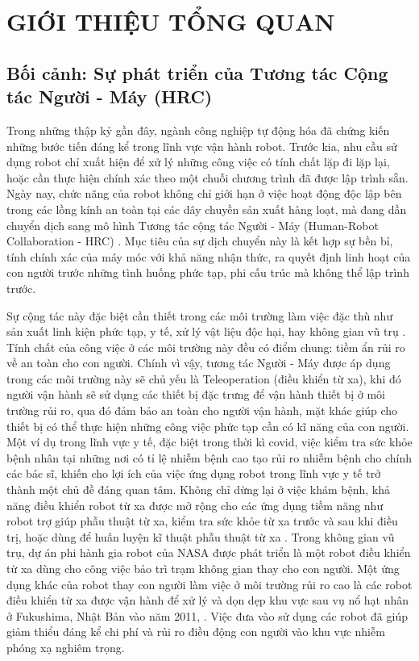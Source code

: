 
\chapter{GIỚI THIỆU TỔNG QUAN}

\section{Bối cảnh: Sự phát triển của Tương tác Cộng tác Người - Máy (HRC)}
Trong những thập kỷ gần đây, ngành công nghiệp tự động hóa đã chứng kiến những bước tiến đáng kể trong lĩnh vực vận hành robot. Trước kia, nhu cầu sử dụng robot chỉ xuất hiện để xử lý những công việc có tính chất lặp đi lặp lại, hoặc cần thực hiện chính xác theo một chuỗi chương trình đã được lập trình sẵn. Ngày nay, chức năng của robot không chỉ giới hạn ở việc hoạt động độc lập bên trong các lồng kính an toàn tại các dây chuyền sản xuất hàng loạt, mà đang dần chuyển dịch sang mô hình Tương tác cộng tác Người - Máy (Human-Robot Collaboration - HRC) \cite{wang2024genealogy}. Mục tiêu của sự dịch chuyển này là kết hợp sự bền bỉ, tính chính xác của máy móc với khả năng nhận thức, ra quyết định linh hoạt của con người trước những tình huống phức tạp, phi cấu trúc mà không thể lập trình trước.

Sự cộng tác này đặc biệt cần thiết trong các môi trường làm việc đặc thù như sản xuất linh kiện phức tạp, y tế, xử lý vật liệu độc hại, hay không gian vũ trụ \cite{pryor2023virtualspace}. Tính chất của công việc ở các môi trường này đều có điểm chung: tiềm ẩn rủi ro về an toàn cho con người. Chính vì vậy, tương tác Người - Máy được áp dụng trong các môi trường này sẽ chủ yếu là Teleoperation (điều khiển từ xa), khi đó người vận hành sẽ sử dụng các thiết bị đặc trưng để vận hành thiết bị ở môi trường rủi ro, qua đó đảm bảo an toàn cho người vận hành, mặt khác giúp cho thiết bị có thể thực hiện những công việc phức tạp cần có kĩ năng của con người. Một ví dụ trong lĩnh vực y tế, đặc biệt trong thời kì covid, việc kiểm tra sức khỏe bệnh nhân tại những nơi có tỉ lệ nhiễm bệnh cao tạo rủi ro nhiễm bệnh cho chính các bác sĩ, khiến cho lợi ích của việc ứng dụng robot trong lĩnh vực y tế trở thành một chủ đề đáng quan tâm. Không chỉ dừng lại ở việc khám bệnh, khả năng điều khiển robot từ xa được mở rộng cho các ứng dụng tiềm năng như robot trợ giúp phẫu thuật từ xa, kiểm tra sức khỏe từ xa trước và sau khi điều trị, hoặc dùng để huấn luyện kĩ thuật phẫu thuật từ xa \cite{Su2022MixedRealityEnhancedHI}. Trong không gian vũ trụ, dự án phi hành gia robot của NASA được phát triển là một robot điều khiển từ xa \cite{zang2023FiveDimensional} dùng cho công việc bảo trì trạm không gian thay cho con người. Một ứng dụng khác của robot thay con người làm việc ở môi trường rủi ro cao là các robot điều khiển từ xa được vận hành để xử lý và dọn dẹp khu vực sau vụ nổ hạt nhân ở Fukushima, Nhật Bản vào năm 2011, \cite{Kawatsuma2012EmergencyResponseBy}. Việc đưa vào sử dụng các robot đã giúp giảm thiểu đáng kể chi phí và rủi ro điều động con người vào khu vực nhiễm phóng xạ nghiêm trọng. 

